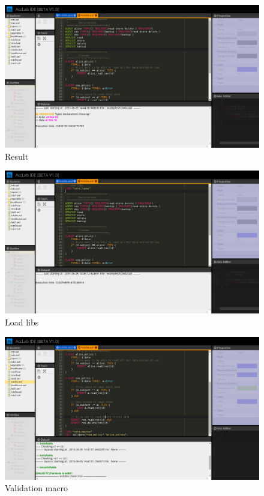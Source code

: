 \begin{figure}[!ht]
      \center
      \includegraphics[width=15cm,angle=0]{assets/gui/interface7.png}
      \caption{Result}
\end{figure}

\begin{figure}[!ht]
      \center
      \includegraphics[width=15cm,angle=0]{assets/gui/interface8.png}
      \caption{Load libs}
\end{figure}

\begin{figure}[!ht]
      \center
      \includegraphics[width=15cm,angle=0]{assets/gui/interface9.png}
      \caption{Validation macro}
\end{figure}
